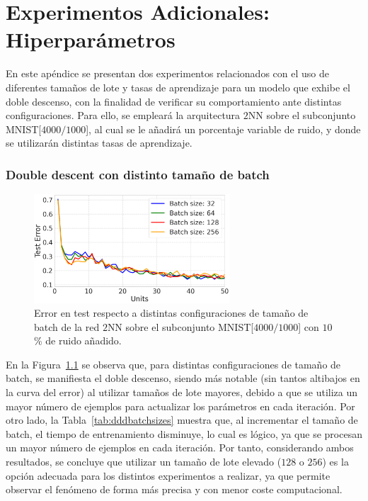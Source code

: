 
\chapter{Experimentos Adicionales: Hiperparámetros}\label{ap:apendiceB}

En este apéndice se presentan dos experimentos relacionados con el uso de diferentes tamaños de lote y tasas de aprendizaje para un modelo que exhibe el doble descenso, con la finalidad de verificar su comportamiento ante distintas configuraciones. Para ello, se empleará la arquitectura $2$NN sobre el subconjunto MNIST[$4000/1000$], al cual se le añadirá un porcentaje variable de ruido, y donde se utilizarán distintas tasas de aprendizaje.
 
\subsection*{Double descent con distinto tamaño de batch}

\begin{figure}[h!]
    \centering
    \includegraphics[width=0.65\textwidth]{img/experiments/batch_sizes_ddd.png}
    \caption[Doble descenso para distintos tamaños de lote.]{Error en test respecto a distintas configuraciones de tamaño de batch de la red $2$NN sobre el subconjunto MNIST[$4000/1000$] con $10$\% de ruido añadido.}\label{fig:dddbatchsizes}
\end{figure}

En la Figura~\ref{fig:dddbatchsizes} se observa que, para distintas configuraciones de tamaño de batch, se manifiesta el doble descenso, siendo más notable (sin tantos altibajos en la curva del error) al utilizar tamaños de lote mayores, debido a que se utiliza un mayor número de ejemplos para actualizar los parámetros en cada iteración. Por otro lado, la Tabla~\ref{tab:dddbatchsizes} muestra que, al incrementar el tamaño de batch, el tiempo de entrenamiento disminuye, lo cual es lógico, ya que se procesan un mayor número de ejemplos en cada iteración. Por tanto, considerando ambos resultados, se concluye que utilizar un tamaño de lote elevado ($128$ o $256$) es la opción adecuada para los distintos experimentos a realizar, ya que permite observar el fenómeno de forma más precisa y con menor coste computacional.

